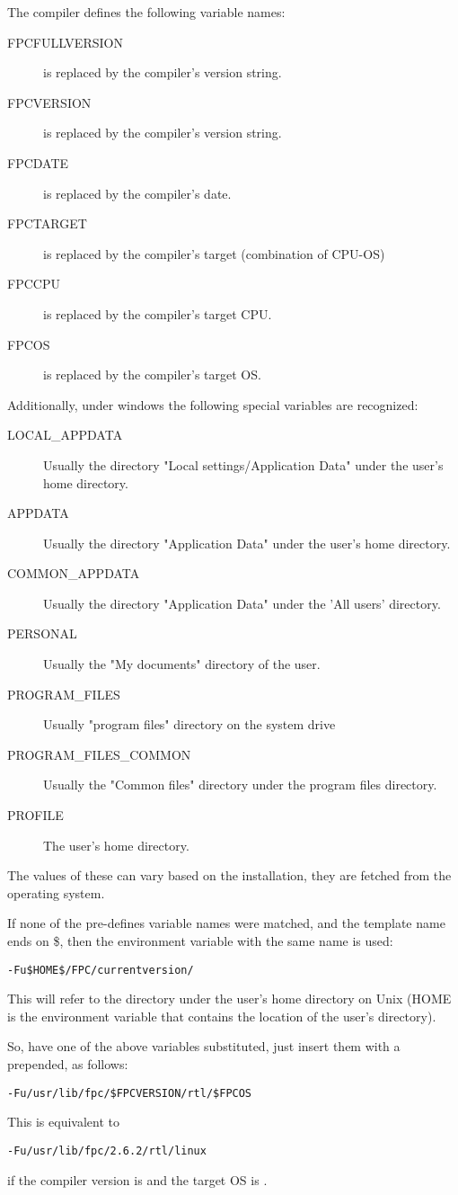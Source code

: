 The compiler defines the following variable names:
\begin{description}
\item[FPCFULLVERSION] is replaced by the compiler's version string.
\item[FPCVERSION] is replaced by the compiler's version string.
\item[FPCDATE] is replaced by the compiler's date.
\item[FPCTARGET] is replaced by the compiler's target (combination of CPU-OS)
\item[FPCCPU] is replaced by the compiler's target CPU.
\item[FPCOS] is replaced by the compiler's target OS.
\end{description}
Additionally, under windows the following special variables are recognized:
\begin{description}
\item[LOCAL\_APPDATA]  Usually the directory "Local settings/Application Data" under the user's home directory.
\item[APPDATA] Usually the directory "Application Data" under the user's home directory.
\item[COMMON\_APPDATA] Usually the directory "Application Data" under the 'All users' directory.
\item[PERSONAL] Usually the "My documents" directory of the user.
\item[PROGRAM\_FILES] Usually "program files" directory on the system drive
\item[PROGRAM\_FILES\_COMMON] Usually the "Common files" directory under the program files directory.
\item[PROFILE] The user's home directory.
\end{description}
The values of these can vary based on the installation, they are fetched from the operating system.

If none of the pre-defines variable names were matched, and the template name ends on \$,
then the environment variable with the same name is used:
\begin{verbatim}
-Fu$HOME$/FPC/currentversion/
\end{verbatim}
This will refer to the directory  under the user's home
directory on Unix (HOME is the environment variable that contains the
location of the user's directory).

So, have one of the above variables substituted, just insert them with a \var{\$}
prepended, as follows:
\begin{verbatim}
-Fu/usr/lib/fpc/$FPCVERSION/rtl/$FPCOS
\end{verbatim}
This is equivalent to
\begin{verbatim}
-Fu/usr/lib/fpc/2.6.2/rtl/linux
\end{verbatim}
if the compiler version is  and the target OS is \linux{}.

